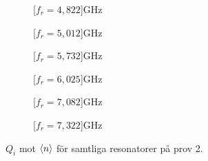 \documentclass[../../main.tex]{subfiles}
\begin{document}
\begin{figure}[H]
    \begin{subfigure}{0.33\textwidth}
        \centering
        \setlength{}
        \setlength\figureheight{10em}
        
        \caption{\unit[$f_r=4,822$]{GHz}}
    \end{subfigure}
    \begin{subfigure}{0.33\textwidth}
        \centering
        \setlength{}
        \setlength\figureheight{10em}
        
        \caption{\unit[$f_r=5,012$]{GHz}}
    \end{subfigure}
    \begin{subfigure}{0.33\textwidth}
        \centering
        \setlength{}
        \setlength\figureheight{10em}
        
        \caption{\unit[$f_r=5,732$]{GHz}}
    \end{subfigure}

    \begin{subfigure}{0.33\textwidth}
        \centering
        \setlength{}
        \setlength\figureheight{10em}
        
        \caption{\unit[$f_r=6,025$]{GHz}}
    \end{subfigure}
        \begin{subfigure}{0.33\textwidth}
        \centering
        \setlength{}
        \setlength\figureheight{10em}
        
        \caption{\unit[$f_r=7,082$]{GHz}}
    \end{subfigure}
    \begin{subfigure}{0.33\textwidth}
        \centering
        \setlength{}
        \setlength\figureheight{10em}
        
        \caption{\unit[$f_r=7,322$]{GHz}}
    \end{subfigure}
    \caption{$Q_i$ mot $\expval{n}$ för samtliga resonatorer på prov 2.}
\end{figure}


 
 
 
\end{document}
